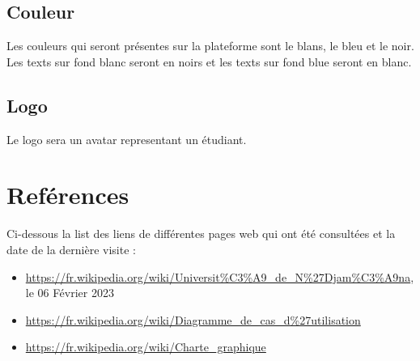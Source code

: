 \documentclass[12pt,a4paper]{article}
\begin{document}
	\subsection{Couleur}
	Les couleurs qui seront présentes sur la plateforme sont le blans, le bleu et le noir. Les texts sur fond blanc seront en noirs et les texts sur fond blue seront en blanc.
	
	\subsection{Logo}
	Le logo sera un avatar representant un étudiant.
	
	
	

	
	\newpage
	\section*{Reférences}
	Ci-dessous la list des liens de différentes pages web qui ont été consultées et la date de la dernière visite :
	\begin{itemize}
		\item \href{https://fr.wikipedia.org/wiki/Universit\%C3\%A9\_de\_N\%27Djam\%C3\%A9na}{https://fr.wikipedia.org/wiki/Universit\%C3\%A9\_de\_N\%27Djam\%C3\%A9na}, le 06 Février 2023
		\item \href{https://fr.wikipedia.org/wiki/Diagramme_de_cas_d\%27utilisation}{https://fr.wikipedia.org/wiki/Diagramme\_de\_cas\_d\%27utilisation}
		\item \href{https://fr.wikipedia.org/wiki/Charte_graphique}{https://fr.wikipedia.org/wiki/Charte\_graphique}
	\end{itemize}	
\end{document}
